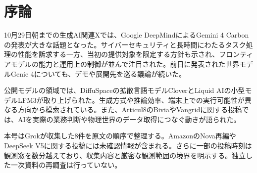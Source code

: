 \section*{序論}
10月29日朝までの生成AI関連Xでは、Google DeepMindによるGemini 4 Carbonの発表が大きな話題となった。サイバーセキュリティと長時間にわたるタスク処理の性能を訴求する一方、当初の提供対象を限定する方針も示され、フロンティアモデルの能力と運用上の制御が並んで注目された。前日に発表された世界モデルGenie 4についても、デモや展開先を巡る議論が続いた。

公開モデルの領域では、DiffuSpaceの拡散言語モデルCloverとLiquid AIの小型モデルLFM3が取り上げられた。生成方式や推論効率、端末上での実行可能性が異なる方向から模索されている。また、Articul8のBiviaやVangridに関する投稿では、AIを実際の業務判断や物理世界のデータ取得につなぐ動きが語られた。

本号はGrokが収集した8件を原文の順序で整理する。AmazonのNova再編やDeepSeek V5に関する投稿には未確認情報が含まれる。さらに一部の投稿時刻は観測窓を数分越えており、収集内容と厳密な観測範囲の境界を明示する。独立した一次資料の再調査は行っていない。
